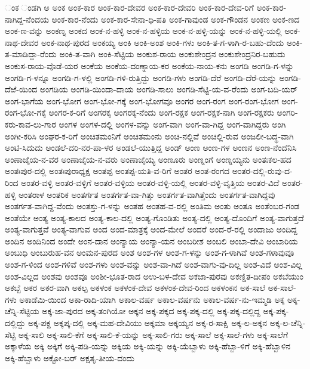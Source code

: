 ಂಕ
ಂಡಗಿ
ಅ
ಅಂಕ
ಅಂಕ-ಕಾರ
ಅಂಕ-ಕಾರ-ದೇವರ
ಅಂಕ-ಕಾರ-ದೇವರಿ
ಅಂಕ-ಕಾರ-ದೇವ-ರಿಗೆ
ಅಂಕ-ಕಾರ-ನಾಗಿದ್ದ-ನೆಂದಯ
ಅಂಕ-ಕಾರ-ನೆಂದು
ಅಂಕ-ಕಾರ-ಸೇನಾ-ಧಿ-ಪತಿ
ಅಂಕ-ಗಾವುಂಡ
ಅಂಕ-ಗೌಂಡನ
ಅಂಕಣ
ಅಂಕ-ಣದ
ಅಂಕ-ಣ-ವನ್ನು
ಅಂಕಣ್ನ
ಅಂಕದ
ಅಂಕ-ನ-ಹಳ್ಳಿ
ಅಂಕ-ನ-ಹಳ್ಳಿಯ
ಅಂಕ-ನ-ಹಳ್ಳಿ-ಯನ್ನು
ಅಂಕ-ನ-ಹಳ್ಳಿ-ಯಲ್ಲಿ
ಅಂಕ-ನಾಥ-ದೇವರ
ಅಂಕ-ನಾಥ-ಪುರದ
ಅಂಕಯ್ಯ
ಅಂಕಿ
ಅಂಕಿ-ಅಂಶ
ಅಂಕಿ-ಗಳು
ಅಂಕಿ-ತ-ಗ-ಳಾಗಿ-ರ-ಬಹು-ದೆಂದು
ಅಂಕಿ-ತ-ಮಾಡಿದ್ದಾ-ರೆಂದು
ಅಂಕಿ-ತ-ವಾಗಿ
ಅಂಕಿ-ಸೆಟ್ಟಿಯ
ಅಂಕುಶ-ರಾಯ
ಅಂಕುಶೇಂದ್ರನ
ಅಂಕುಶೇಂದ್ರನಿರ-ಬಹುದು
ಅಂಕುಸ-ರಾಯ-ವೊಡೆ-ಯರ
ಅಂಕೆಯ
ಅಂಕೆಯ-ದಂಣ್ನಾಯ-ಕರ
ಅಂಕೆಯ-ನಾಯ-ಕನು
ಅಂಗಡಿ
ಅಂಗಡಿ-ಗ-ಳನ್ನು
ಅಂಗಡಿ-ಗ-ಳನ್ನೂ
ಅಂಗಡಿ-ಗ-ಳಲ್ಲಿ
ಅಂಗಡಿ-ಗಳಿ-ರುತ್ತಿದ್ದು
ಅಂಗಡಿ-ಗಳು
ಅಂಗಡಿ-ದೆರೆ
ಅಂಗಡಿ-ದೆರೆ-ಯನ್ನು
ಅಂಗಡಿ-ದೆಱೆ-ಯಿಂದ
ಅಂಗಡಿಯ
ಅಂಗಡಿ-ಯಿಂದಾ-ದಾಯ
ಅಂಗಡಿ-ಸಾಲು
ಅಂಗಡಿ-ಸೆಟ್ಟಿ-ಯ-ವ-ರೆಂದು
ಅಂಗ-ಬದಿ-ಯರ್
ಅಂಗ-ಭಾಗೆಯ
ಅಂಗ-ಭೋಗ
ಅಂಗ-ಭೋ-ಗಕ್ಕೆ
ಅಂಗ-ಭೋಗವೂ
ಅಂಗರ
ಅಂಗ-ರಂಗ
ಅಂಗ-ರಂಗ-ಭೋಗ
ಅಂಗ-ರಂಗ-ಭೋ-ಗಕ್ಕೆ
ಅಂಗರ-ಕ-ರಿಗೆ
ಅಂಗರಕ್ಕ
ಅಂಗರಕ್ಕ-ನೆಂದು
ಅಂಗ-ರಕ್ಷಕ
ಅಂಗ-ರಕ್ಷಕ-ನಾಗಿ
ಅಂಗ-ರಕ್ಷಕರು
ಅಂಗರಿ-ಕರು-ಕಾವ-ಲು-ಗಾರ
ಅಂಗಳ
ಅಂಗಳ-ದಲ್ಲಿ
ಅಂಗಳ-ವನ್ನು
ಅಂಗ-ವಾಗಿ
ಅಂಗ-ವಾ-ಗಿದ್ದ
ಅಂಗ-ವಾಗಿದ್ದರು
ಅಂಗಿ
ಅಂಗೀ-ಕರಿಸಿ
ಅಂಘರ-ಕ-ರಿಗೆ
ಅಂಚಿತಮಂನಿಗೆ
ಅಂಚಿತಮಂನು
ಅಂಚಿ-ನಲ್ಲಿವೆ
ಅಂಚಿಲ್ಲಿ-ರುವ
ಅಂಜಲೀ-ಬದ್ಧ-ವಾಗಿ
ಅಂಟಿ-ಸಿದುದು
ಅಂಡಲೆ-ದರಿ-ನರ-ಪಾ-ಳರ
ಅಂಡಲೆ-ಯುತ್ತಿದ್ದ
ಅಂಡ್
ಅಂಣ
ಅಂಣ-ಗಳ
ಅಂಣನ
ಅಂಣ-ನೆಂದೆನಿಸಿ
ಅಂಣಾಜೈಯ-ನ-ವರ
ಅಂಣಾಜೈಯ-ನ-ವರು
ಅಂಣಾಜೈಯ್ಯ
ಅಂಣೂರು
ಅಂಣ್ನಂಗೆ
ಅಂಣ್ನಯ್ಯನು
ಅಂತಃಕಲ-ಹದ
ಅಂತಃಪುರ-ದಲ್ಲಿ
ಅಂತಃಪುರಾಧ್ಯಕ್ಷ
ಅಂತಪ್ಪ
ಅಂತಪ್ಪ-ಯತಿ-ವ-ರಿಗೆ
ಅಂತರ
ಅಂತ-ರಂಗದ
ಅಂತರ-ದಲ್ಲಿ-ರುವು-ದ-ರಿಂದ
ಅಂತರ-ವಳ್ಳಿ
ಅಂತರ-ವಳ್ಳಿಗೆ
ಅಂತರ-ವಳ್ಳಿಯ
ಅಂತರ-ವಳ್ಳಿ-ಯಲ್ಲಿ
ಅಂತರ-ವಳ್ಳಿ-ವೃತ್ತಿಯ
ಅಂತರ-ವಿದೆ
ಅಂತರ-ಹಳ್ಳಿ
ಅಂತರಾಳ
ಅಂತರಿಕ
ಅಂತರ್ಗತ
ಅಂತರ್ಗತ-ವಾ-ಗಿತ್ತು
ಅಂತರ್ಗತ-ವಾಗಿತ್ತೆಂದು
ಅಂತರ್ಗತ-ವಾಗಿದ್ದವು
ಅಂತರ್ಗತ-ವಾಗಿದ್ದ-ವೆಂದು
ಅಂತಸ್ತು-ಗ-ಳನ್ನು
ಅಂತಹ
ಅಂತಹ-ವ-ರಲ್ಲಿ
ಅಂತಿಮ
ಅಂತು
ಅಂತೂ
ಅಂತೆಂಬರ-ಗಂಡ
ಅಂತೆಯೇ
ಅಂತ್ಯ
ಅಂತ್ಯ-ಕಾಲದ
ಅಂತ್ಯ-ಕಾಲ-ದಲ್ಲಿ
ಅಂತ್ಯ-ಗೊಂಡಿತು
ಅಂತ್ಯ-ದಲ್ಲಿ
ಅಂತ್ಯ-ದೊಂದಿಗೆ
ಅಂತ್ಯ-ವಾಗುತ್ತದೆ
ಅಂತ್ಯ-ವಾಗುತ್ತವೆ
ಅಂತ್ಯ-ವಾಗುವ
ಅಂದ
ಅಂದ-ಮಾತ್ರಕ್ಕೆ
ಅಂದ-ಮೇಲೆ
ಅಂದರೆ
ಅಂದ-ರೆ-ರಲ್ಲಿ
ಅಂದಾಜು
ಅಂದಿದ್ದ
ಅಂದಿನ
ಅಂದಿನಿಂದ
ಅಂದೇ
ಅಂನ-ದಾನ
ಅಂನ್ಯಾಯ
ಅಂನ್ಯಾ-ಯನ
ಅಂಬರೀಶ
ಅಂಬಲಿ
ಅಂಬಾ-ದೇವಿ
ಅಂಬಾರಿಯ
ಅಂಬುಧಿ
ಅಂಬುರುಹ-ವನ
ಅಂಮನ-ಪುರದ
ಅಂಶ
ಅಂಶ-ಗಳ
ಅಂಶ-ಗ-ಳನ್ನು
ಅಂಶ-ಗ-ಳಾಗಿವೆ
ಅಂಶ-ಗಳಾವುವೂ
ಅಂಶ-ಗ-ಳಿಂದ
ಅಂಶ-ಗಳಿವೆ
ಅಂಶ-ಗಳು
ಅಂಶ-ವನ್ನು
ಅಂಶ-ವಾ-ಗಿದೆ
ಅಂಶ-ವಾಗು-ವು-ದಿಲ್ಲ
ಅಂಶ-ವಿದೆ
ಅಂಶ-ವಿಲ್ಲ
ಅಂಶ-ವಿಲ್ಲದ
ಅಂಶವು
ಅಂಶವೂ
ಅಂಶೀ-ಭೂತ-ರಾದ
ಅಉ-ಬಳ-ದೇವ
ಅಕಜಾ-ಪುರವು
ಅಕಣ್ಡಿತ-ದೀಪಂ
ಅಕಬೆಯುಂ
ಅಕಬ್ಬೆ
ಅಕರ
ಅಕರ-ವಾಗಿ
ಅಕಲ್ಪ
ಅಕಳಂಕ
ಅಕಳಂಕ-ದೇವ
ಅಕಳಂಕ-ದೇವ-ರಿಂದ
ಅಕಳಂಕನ
ಅಕ-ಸಾಲೆ
ಅಕ-ಸಾಲೆ-ಗಳು
ಅಕಾಡೆಮಿ-ಯಿಂದ
ಅಕಾ-ರಾದಿ-ಯಾಗಿ
ಅಕಾಲ-ವರ್ಷ
ಅಕಾಲ-ವರ್ಷನು
ಅಕಾಲ-ವರ್ಷ-ನು-ಇಮ್ಮಡಿ
ಅಕ್ಕ
ಅಕ್ಕ-ಚೆನ್ನಿ-ಸೆಟ್ಟಿಯ
ಅಕ್ಕ-ಜಾ-ಪುರದ
ಅಕ್ಕ-ತಂಗಿಯೋ
ಅಕ್ಕನ
ಅಕ್ಕ-ಪಕ್ಕದ
ಅಕ್ಕ-ಪಕ್ಕ-ದಲ್ಲಿ
ಅಕ್ಕ-ಪಕ್ಕ-ದಲ್ಲಿದ್ದ
ಅಕ್ಕ-ಪಕ್ಕ-ದಲ್ಲಿದ್ದು
ಅಕ್ಕ-ಪಕ್ದ
ಅಕ್ಕಪ್ಕ-ದಲ್ಲಿ
ಅಕ್ಕ-ಮಹ-ದೇವಿಯು
ಅಕ್ಕಮಾ
ಅಕ್ಕಯ್ಯನ
ಅಕ್ಕ-ರ-ಸಾಕ್ಷಿ
ಅಕ್ಕ-ಲ-ಅಕ್ಕನ
ಅಕ್ಕ-ಲ-ಚೆನ್ನಿ-ಸೆಟ್ಟಿ
ಅಕ್ಕ-ಸಾಲಿ
ಅಕ್ಕ-ಸಾಲಿ-ಕೆಗೆ
ಅಕ್ಕ-ಸಾಲಿ-ಕೆ-ಯನ್ನು
ಅಕ್ಕ-ಸಾಲಿ-ಗರು
ಅಕ್ಕ-ಸಾಲೆ
ಅಕ್ಕ-ಸಾಲೆ-ಗಳು
ಅಕ್ಕ-ಸಾಲೆಗೆ
ಅಕ್ಕಾಳೆಯ
ಅಕ್ಕಿ
ಅಕ್ಕಿಗೆ
ಅಕ್ಕಿ-ಪಡಿ-ಯನ್ನು
ಅಕ್ಕಿಯ
ಅಕ್ಕಿ-ಯನ್ನು
ಅಕ್ಕಿ-ಯೆಬ್ಬಾಳು
ಅಕ್ಕಿ-ಹೆಬ್ಬಾ-ಳಿಗೆ
ಅಕ್ಕಿ-ಹೆಬ್ಬಾಳಿನ
ಅಕ್ಕಿ-ಹೆಬ್ಬಾಳು
ಅಕ್ಟೋ-ಬರ್
ಅಕ್ಷತೃ-ತೀಯ-ದಂದು
